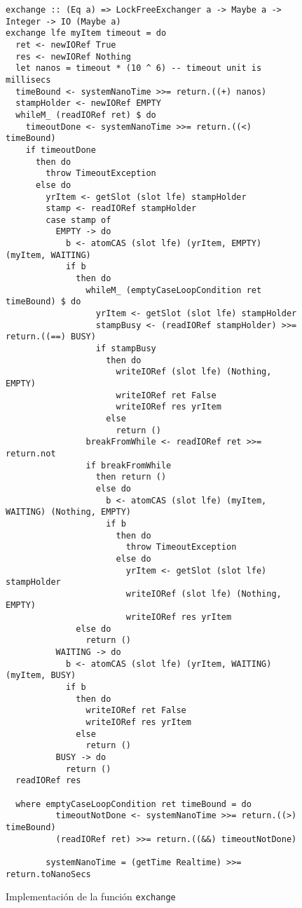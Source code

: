 \begin{figure}[H]
  \centering
  \begin{verbatim}
exchange :: (Eq a) => LockFreeExchanger a -> Maybe a -> Integer -> IO (Maybe a)
exchange lfe myItem timeout = do
  ret <- newIORef True
  res <- newIORef Nothing
  let nanos = timeout * (10 ^ 6) -- timeout unit is millisecs
  timeBound <- systemNanoTime >>= return.((+) nanos)
  stampHolder <- newIORef EMPTY
  whileM_ (readIORef ret) $ do
    timeoutDone <- systemNanoTime >>= return.((<) timeBound)
    if timeoutDone
      then do
        throw TimeoutException
      else do
        yrItem <- getSlot (slot lfe) stampHolder
        stamp <- readIORef stampHolder
        case stamp of
          EMPTY -> do
            b <- atomCAS (slot lfe) (yrItem, EMPTY) (myItem, WAITING)
            if b
              then do
                whileM_ (emptyCaseLoopCondition ret timeBound) $ do
                  yrItem <- getSlot (slot lfe) stampHolder
                  stampBusy <- (readIORef stampHolder) >>= return.((==) BUSY)
                  if stampBusy
                    then do
                      writeIORef (slot lfe) (Nothing, EMPTY)
                      writeIORef ret False
                      writeIORef res yrItem
                    else
                      return ()
                breakFromWhile <- readIORef ret >>= return.not
                if breakFromWhile
                  then return ()
                  else do
                    b <- atomCAS (slot lfe) (myItem, WAITING) (Nothing, EMPTY)
                    if b
                      then do
                        throw TimeoutException
                      else do
                        yrItem <- getSlot (slot lfe) stampHolder
                        writeIORef (slot lfe) (Nothing, EMPTY)
                        writeIORef res yrItem
              else do
                return ()
          WAITING -> do
            b <- atomCAS (slot lfe) (yrItem, WAITING) (myItem, BUSY)
            if b
              then do
                writeIORef ret False
                writeIORef res yrItem
              else
                return ()
          BUSY -> do
            return ()
  readIORef res

  where emptyCaseLoopCondition ret timeBound = do
          timeoutNotDone <- systemNanoTime >>= return.((>) timeBound)
          (readIORef ret) >>= return.((&&) timeoutNotDone)

        systemNanoTime = (getTime Realtime) >>= return.toNanoSecs
\end{verbatim}
  \caption{Implementación de la función \texttt{exchange}}
  \label{fig:exchange-io}
\end{figure}

